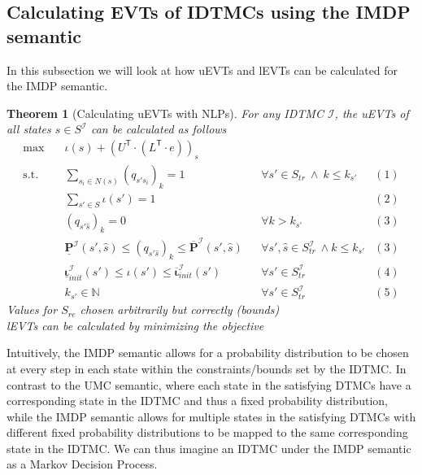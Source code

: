 \documentclass[journal,compsoc,10pt]{IEEEtran}
\newcommand{\NN}{\mathbb{N}}
\newcommand{\IMC}{\mathcal{I}} %
\newcommand{\PFupper}{\mathbf{\overline{P}}}
\newcommand{\PFlower}{\mathbf{\underline{P}}}
\newcommand{\Initupper}{\mathbf{\overline{\iota}}_{init}}
\newcommand{\Initlower}{\mathbf{\underline{\iota}}_{init}}
\newcommand{\T}{\mathsf{T}}            %
\newtheorem{theorem}{Theorem}[section]
\begin{document}
\subsection{Calculating EVTs of IDTMCs using the IMDP semantic}
In this subsection we will look at how uEVTs and lEVTs can be calculated for the IMDP semantic.

\begin{theorem}[Calculating uEVTs with NLPs]\label{th:calc_uEVT_with_NLP_IMDP_semantic}
    For any IDTMC $\IMC$, the uEVTs of all states $s\in S^\IMC$ can be calculated as follows
    \[
   \begin{aligned}
        \max \quad & \iota(s)+(U^\T\cdot(L^\T\cdot e))_s\\
        \text{s.t.} \quad & \sum_{s_i\in N(s)} (q_{s's_i})_k = 1 && \forall s'\in S_{tr} \ \land \ k \leq k_{s'}  & (1)\\
        & \sum_{s'\in S} \iota(s') = 1 && & (2)\\
        & (q_{s'\hat{s}})_{k} = 0 && \forall k > k_{s'} & (3)\\
        & \PFlower^\IMC(s',\hat{s}) \leq (q_{s'\hat{s}})_{k} \leq \PFupper^\IMC(s',\hat{s}) && \forall s',\hat{s}\in S_{tr}^\IMC \ \land k \leq k_{s'}& (3)\\
        & \Initlower^\IMC (s') \leq \iota(s') \leq \Initupper^\IMC (s') && \forall s'\in S_{tr}^\IMC & (4) \\
        & k_{s'} \in \NN && \forall s'\in S_{tr}^\IMC & (5)
    \end{aligned}
    \]
    Values for $S_{re}$ chosen arbitrarily but correctly (bounds)\\
    lEVTs can be calculated by minimizing the objective
\end{theorem}


Intuitively, the IMDP semantic allows for a probability distribution to be chosen at every step in each state within the constraints/bounds set by the IDTMC. In contrast to the UMC semantic, where each state in the satisfying DTMCs have a corresponding state in the IDTMC and thus a fixed probability distribution, while the IMDP semantic allows for multiple states in the satisfying DTMCs with different fixed probability distributions to be mapped to the same corresponding state in the IDTMC. We can thus imagine an IDTMC under the IMDP semantic as a Markov Decision Process.
\end{document}
